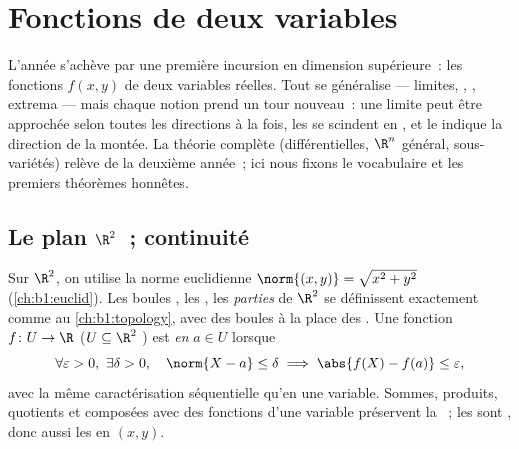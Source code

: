 \chapter{Fonctions de deux variables}\label{ch:b1:multivar}

L'année s'achève par une première incursion en dimension
supérieure~: les fonctions $f(x, y)$ de deux variables réelles.
Tout se généralise --- limites, , , extrema ---
mais chaque notion prend un tour nouveau~: une limite peut être
approchée selon toutes les directions à la fois, les  se
scindent en , et le  indique la
direction de la montée. La théorie complète (différentielles,
$\R^n$ général, sous-variétés) relève de la deuxième année~; ici
nous fixons le vocabulaire et les premiers théorèmes honnêtes.

\section{Le plan $\R^2$~; continuité}

\begin{definition}\label{def:b1:multivar:topology}
Sur $\R^2$, on utilise la norme euclidienne $\norm{(x,y)} = \sqrt{x^2 + y^2}$
(\cref{ch:b1:euclid}). Les boules , les , les
\emph{parties } de $\R^2$ se définissent exactement comme
au \cref{ch:b1:topology}, avec des boules à la place des
. Une fonction $f \colon U \to \R$ ($U \subseteq \R^2$
) est \emph{ en} $a \in U$ lorsque
\[
\forall\varepsilon > 0,\ \exists\delta > 0, \quad
\norm{X - a} \leq \delta \implies \abs{f(X) - f(a)} \leq
\varepsilon,
\]
avec la même caractérisation séquentielle qu'en une variable.
Sommes, produits, quotients et composées avec des fonctions
 d'une variable préservent la ~; les
  sont , donc aussi les 
en $(x,y)$.
\end{definition}

